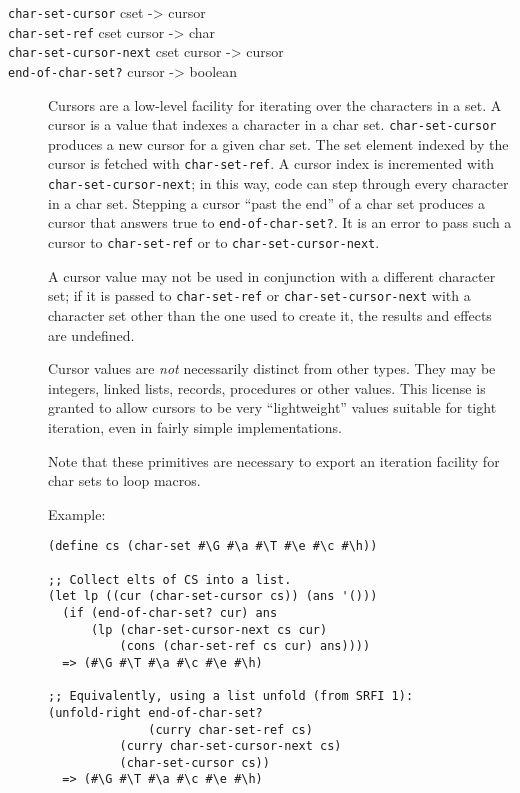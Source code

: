 \begin{description}
\item[ \href{}{} \href{}{} \href{}{} \href{}{} \texttt{char-set-cursor}
cset -\textgreater{} cursor\\
\texttt{char-set-ref} cset cursor -\textgreater{} char\\
\texttt{char-set-cursor-next} cset cursor -\textgreater{} cursor\\
\texttt{end-of-char-set?} cursor -\textgreater{} boolean ]
Cursors are a low-level facility for iterating over the characters in a
set. A cursor is a value that indexes a character in a char set.
\texttt{char-set-cursor} produces a new cursor for a given char set. The
set element indexed by the cursor is fetched with \texttt{char-set-ref}.
A cursor index is incremented with \texttt{char-set-cursor-next}; in
this way, code can step through every character in a char set. Stepping
a cursor ``past the end'' of a char set produces a cursor that answers
true to \texttt{end-of-char-set?}. It is an error to pass such a cursor
to \texttt{char-set-ref} or to \texttt{char-set-cursor-next}.

A cursor value may not be used in conjunction with a different character
set; if it is passed to \texttt{char-set-ref} or
\texttt{char-set-cursor-next} with a character set other than the one
used to create it, the results and effects are undefined.

Cursor values are \emph{not} necessarily distinct from other types. They
may be integers, linked lists, records, procedures or other values. This
license is granted to allow cursors to be very ``lightweight'' values
suitable for tight iteration, even in fairly simple implementations.

Note that these primitives are necessary to export an iteration facility
for char sets to loop macros.

Example:

\begin{verbatim}
(define cs (char-set #\G #\a #\T #\e #\c #\h))

;; Collect elts of CS into a list.
(let lp ((cur (char-set-cursor cs)) (ans '()))
  (if (end-of-char-set? cur) ans
      (lp (char-set-cursor-next cs cur)
          (cons (char-set-ref cs cur) ans))))
  => (#\G #\T #\a #\c #\e #\h)

;; Equivalently, using a list unfold (from SRFI 1):
(unfold-right end-of-char-set? 
              (curry char-set-ref cs)
          (curry char-set-cursor-next cs)
          (char-set-cursor cs))
  => (#\G #\T #\a #\c #\e #\h)
\end{verbatim}


\end{description}
